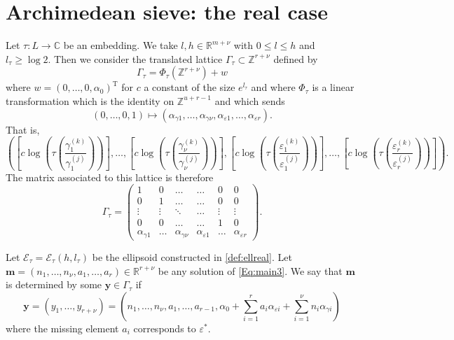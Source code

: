 \section{Archimedean sieve: the real case}

Let $\tau:L\to\mathbb{C}$ be an embedding. We take $l,h \in \mathbb{R}^{m+\nu}$ with $0\leq l\leq h$ and $l_\tau\geq \log 2$. Then we consider the 
translated lattice $\Gamma_{\tau}\subset \mathbb{Z}^{r + \nu}$ defined by 
\[\Gamma_{\tau} =\Phi_{\tau}(\mathbb{Z}^{r+\nu})+w\]
where $w=(0,\dotsc,0,\alpha_0)^{\text{T}}$ for $c$ a constant of the size $e^{l_\tau}$ and where $\Phi_\tau$ is a linear transformation which is the identity on $\mathbb{Z}^{u+r - 1}$ and which sends 
\[(0, \dots, 0, 1) \mapsto (\alpha_{\gamma 1}, \dots, \alpha_{\gamma {\nu}}, \alpha_{\varepsilon 1}, \dots, \alpha_{\varepsilon {r}}).\]
That is, 
\[\left( \left[c\log\left(\tau\left(\frac{\gamma_1^{(k)}}{\gamma_1^{(j)}}\right)\right)\right], \dots, \left[c\log\left(\tau\left(\frac{\gamma_{\nu}^{(k)}}{\gamma_{\nu}^{(j)}}\right)\right)\right], \left[c\log\left(\tau\left(\frac{\varepsilon_1^{(k)}}{\varepsilon_1^{(j)}}\right)\right)\right], \dots, \left[c\log\left(\tau\left(\frac{\varepsilon_r^{(k)}}{\varepsilon_r^{(j)}}\right)\right)\right] \right).\]
The matrix associated to this lattice is therefore
\[\Gamma_{\tau} = \begin{pmatrix}
	1 & 0 & \dots &  \dots & 0 & 0\\ 
	0 & 1	& \dots & \dots & 0 & 0\\
	\vdots & \vdots & \ddots & \dots & \vdots & \vdots \\ 
	0 & 0 & \dots &  \dots & 1 & 0\\ 
	\alpha_{\gamma 1} & \dots &\alpha_{\gamma {\nu}} & \alpha_{\varepsilon 1} & \dots & \alpha_{\varepsilon {r}}
\end{pmatrix}.\]

Let $\mathcal E_{\tau}=\mathcal E_{\tau}(h,l_{\tau})$ be the ellipsoid constructed in \eqref{def:ellreal}. Let ${\mathbf{m} = (n_1, \dots, n_{\nu}, a_1, \dots, a_r) \in \mathbb{R}^{r + \nu}}$ be any solution of \eqref{Eq:main3}. We say that $\mathbf{m}$ is determined by some $\mathbf{y} \in \Gamma_{\tau}$ if 
\[\mathbf{y} = (y_1, \dots, y_{r+ \nu}) = \left(n_1, \dots, n_{\nu}, a_1, \dots, a_{r-1}, \alpha_0+\sum_{i = 1}^r a_i \alpha_{\varepsilon i} + \sum_{i = 1}^{\nu} n_i \alpha_{\gamma i}\right)\]
where the missing element $a_{i}$ corresponds to $\varepsilon^*$.

